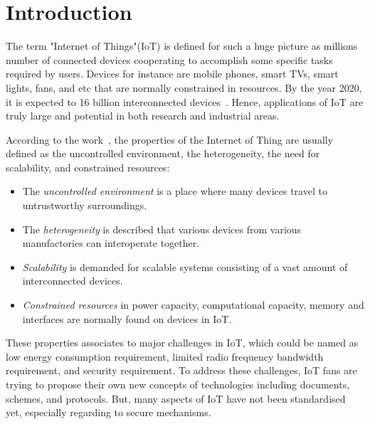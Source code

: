 \chapter{Introduction} %

\label{Chapter1} %


The term "Internet of Things"(IoT) is defined for such a huge picture as millions number of connected devices cooperating to accomplish some specific tasks required by users. Devices for instance are mobile phones, smart TVs, smart lights, fans, and etc that are normally constrained in resources. By the year 2020, it is expected to 16 billion interconnected devices~\cite{iotsurvey}. Hence, applications of IoT are truly large and potential in both research and industrial areas. 

According to the work~\cite{TUD-CS-2015198}, the properties of the Internet of Thing are usually defined as the uncontrolled environment, the heterogeneity, the need for scalability, and constrained resources:
\begin{itemize}
\item The \emph{uncontrolled environment} is a place where many devices travel to untrustworthy surroundings. 
\item The \emph{heterogeneity} is described that various devices from various manufactories can interoperate together. 
\item \emph{Scalability} is demanded for scalable systems consisting of a vast amount of interconnected devices. 
\item \emph{Constrained resources} in power capacity, computational capacity, memory and interfaces are normally found on devices in IoT. 
\end{itemize}

These properties associates to major challenges in IoT, which could be named as low energy consumption requirement, limited radio frequency bandwidth requirement, and security requirement. To address these challenges, IoT fans are trying to propose their own new concepts of technologies including documents, schemes, and protocols. But, many aspects of IoT have not been standardised yet, especially regarding to secure mechanisms. 

